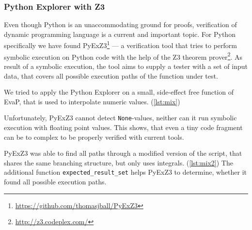 \subsubsection{Python Explorer with Z3}

Even though Python is an unaccommodating ground for proofs, verification of dynamic programming language is a current and important topic.
For Python specifically we have found PyExZ3\footnote{\url{https://github.com/thomasjball/PyExZ3}} --- a verification tool that tries to perform symbolic execution on Python code with the help of the Z3 theorem prover\footnote{\url{http://z3.codeplex.com/}}.
As result of a symbolic execution, the tool aims to supply a tester with a set of input data, that covers all possible execution paths of the function under test.

We tried to apply the Python Explorer on a small, side-effect free function of EvaP, that is used to interpolate numeric values. (\autoref{lst:mix})

Unfortunately, PyExZ3 cannot detect \texttt{None}-values, neither can it run symbolic execution with floating point values.
This shows, that even a tiny code fragment can be to complex to be properly verified with current tools.



PyExZ3 was able to find all paths through a modified version of the script, that shares the same branching structure, but only uses integrals. (\autoref{lst:mix2})
The additional function \texttt{expected\_result\_set} helps PyExZ3 to determine, whether it found all possible execution paths.


